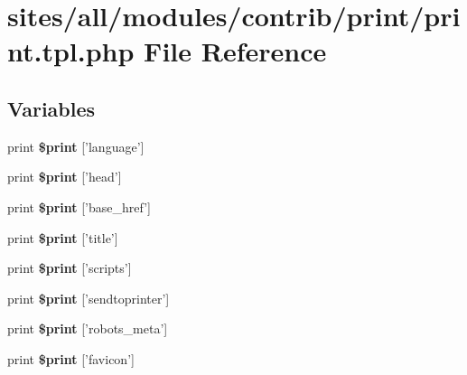 \hypertarget{print_8tpl_8php}{
\section{sites/all/modules/contrib/print/print.tpl.php File Reference}
\label{print_8tpl_8php}
}
\subsection*{Variables}
\begin{CompactItemize}
\item 
\hypertarget{print_8tpl_8php_d6e8a5fefbe6fb4fca7dbe37e4f66a4d}{
print \textbf{\$print} \mbox{[}'language'\mbox{]}}
\label{print_8tpl_8php_d6e8a5fefbe6fb4fca7dbe37e4f66a4d}

\item 
\hypertarget{print_8tpl_8php_107f428da14b8bc7e3ecc9116b5a5a6b}{
print \textbf{\$print} \mbox{[}'head'\mbox{]}}
\label{print_8tpl_8php_107f428da14b8bc7e3ecc9116b5a5a6b}

\item 
\hypertarget{print_8tpl_8php_71661f7c4ed776e2f92f252ac823c3a5}{
print \textbf{\$print} \mbox{[}'base\_\-href'\mbox{]}}
\label{print_8tpl_8php_71661f7c4ed776e2f92f252ac823c3a5}

\item 
\hypertarget{print_8tpl_8php_0d3eb6da53f688224176398347b58632}{
print \textbf{\$print} \mbox{[}'title'\mbox{]}}
\label{print_8tpl_8php_0d3eb6da53f688224176398347b58632}

\item 
\hypertarget{print_8tpl_8php_c504d061ba24cc4f14f99a40609969c7}{
print \textbf{\$print} \mbox{[}'scripts'\mbox{]}}
\label{print_8tpl_8php_c504d061ba24cc4f14f99a40609969c7}

\item 
\hypertarget{print_8tpl_8php_d4fb7d2f1c6b553c2d3283d3c5f209d3}{
print \textbf{\$print} \mbox{[}'sendtoprinter'\mbox{]}}
\label{print_8tpl_8php_d4fb7d2f1c6b553c2d3283d3c5f209d3}

\item 
\hypertarget{print_8tpl_8php_c0803968bb232b33feb094a9a1ff4734}{
print \textbf{\$print} \mbox{[}'robots\_\-meta'\mbox{]}}
\label{print_8tpl_8php_c0803968bb232b33feb094a9a1ff4734}

\item 
\hypertarget{print_8tpl_8php_a2b1a0a0dbde43eb0ff8d24e4dec645d}{
print \textbf{\$print} \mbox{[}'favicon'\mbox{]}}
\label{print_8tpl_8php_a2b1a0a0dbde43eb0ff8d24e4dec645d}


\end{CompactItemize}
